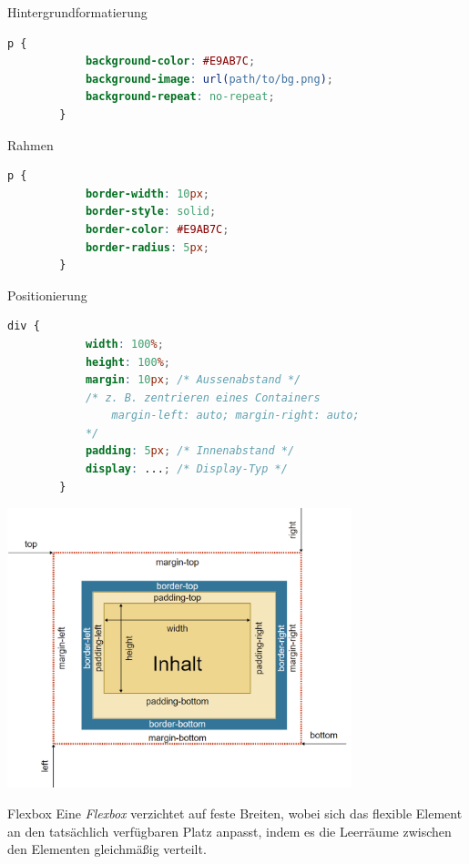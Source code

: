 \begin{bonus}{Hintergrundformatierung}
    \begin{lstlisting}[language=CSS]
        p {
            background-color: #E9AB7C;
            background-image: url(path/to/bg.png);
            background-repeat: no-repeat;
        }
    \end{lstlisting}
\end{bonus}

\begin{bonus}{Rahmen}
    \begin{lstlisting}[language=CSS]
        p {
            border-width: 10px;
            border-style: solid;
            border-color: #E9AB7C;
            border-radius: 5px;
        }
    \end{lstlisting}
\end{bonus}

\begin{bonus}{Positionierung}
    \begin{lstlisting}[language=CSS]
        div {
            width: 100%;
            height: 100%;
            margin: 10px; /* Aussenabstand */
            /* z. B. zentrieren eines Containers
                margin-left: auto; margin-right: auto;
            */
            padding: 5px; /* Innenabstand */
            display: ...; /* Display-Typ */
        }
    \end{lstlisting}

    \begin{center}
        \includegraphics[width=0.75\textwidth]{includes/figures/bonus_css_position.png}
    \end{center}
\end{bonus}

\begin{bonus}{Flexbox}
    Eine \emph{Flexbox} verzichtet auf feste Breiten, wobei sich das flexible Element an den tatsächlich verfügbaren Platz anpasst, indem es die Leerräume zwischen den Elementen gleichmäßig verteilt.
\end{bonus}

